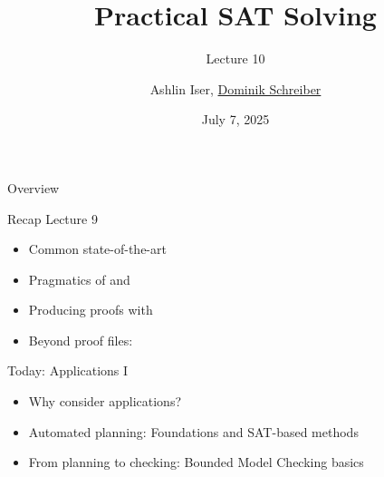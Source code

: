 \documentclass[t,english]{sdqbeamer}
\title{Practical SAT Solving}
\subtitle{Lecture 10 \unimp{\normalfont -- Planning \& Model Checking}}
\author{{Ashlin Iser}, \underline{Dominik Schreiber}}
\date{July 7, 2025}
\begin{document}
\begin{frame}[title white horizontal, picture=logos/blender-render, kitlogo=rgb]
	\titlepage
\end{frame}

\begin{frame}{Overview}
	\begin{block}{Recap Lecture 9}
		\begin{itemize}
			\item Common state-of-the-art 
			\item Pragmatics of  and 
			\item Producing proofs with 
			\item Beyond proof files: 
		\end{itemize}
	\end{block}
	\begin{blueblock}{Today: Applications I}
		\begin{itemize}
			\item Why consider applications?
			\item Automated planning: Foundations and SAT-based methods
			\item From planning to checking: Bounded Model Checking basics
		\end{itemize}
	\end{blueblock}
\end{frame}
\end{document}
